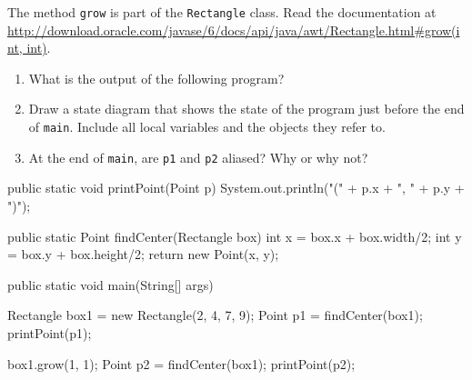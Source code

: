 \begin{exercise}
The method {\tt grow} is part of the {\tt Rectangle} class.  Read the
documentation at
\url{http://download.oracle.com/javase/6/docs/api/java/awt/Rectangle.html#grow(int, int)}.

\begin{enumerate}

\item What is the output of the following program?

\item Draw a state diagram that shows the state of the
program just before the end of {\tt main}.
Include all local variables and the objects
they refer to.

\item At the end of {\tt main}, are {\tt p1} and
{\tt p2} aliased?  Why or why not?

\end{enumerate}

\begin{code}
public static void printPoint(Point p) {
    System.out.println("(" + p.x + ", " + p.y + ")");
}

public static Point findCenter(Rectangle box) {
    int x = box.x + box.width/2;
    int y = box.y + box.height/2;
    return new Point(x, y);
}

public static void main(String[] args) {

    Rectangle box1 = new Rectangle(2, 4, 7, 9);
    Point p1 = findCenter(box1);
    printPoint(p1);

    box1.grow(1, 1);
    Point p2 = findCenter(box1);
    printPoint(p2);
}
\end{code}

\end{exercise}


